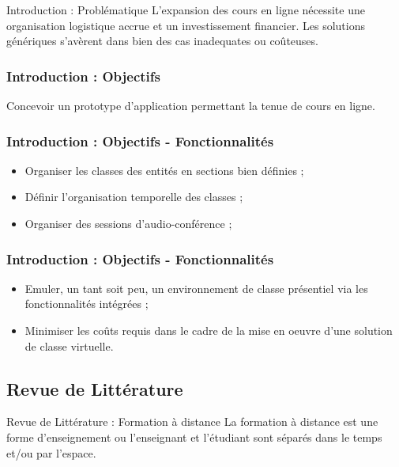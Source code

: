 \documentclass{beamer}
\begin{document}
\begin{frame}{Introduction : \small{Problématique}}
  L'expansion des cours en ligne nécessite une organisation logistique 
  accrue et un investissement financier. Les solutions génériques s'avèrent dans bien 
  des cas inadequates ou coûteuses.
\end{frame}


\begin{frame}
  \frametitle{Introduction : \small{Objectifs}}
    Concevoir un prototype d'application permettant la tenue de cours en ligne.
\end{frame}

\begin{frame}
  \frametitle{Introduction : \small{Objectifs} - \footnotesize{Fonctionnalités}}
  \begin{itemize}
    \item Organiser les classes des entités en sections bien définies ;
    \item Définir l'organisation temporelle des classes ;
    \item Organiser des sessions d’audio-conférence ;
\end{itemize}
\end{frame}

\begin{frame}
  \frametitle{Introduction : \small{Objectifs} - \footnotesize{Fonctionnalités}}
  \begin{itemize}
    \item Emuler, un tant soit peu, un environnement de classe présentiel via les fonctionnalités intégrées ;
    \item Minimiser les coûts requis dans le cadre de la mise en oeuvre d’une solution de classe virtuelle.
\end{itemize}
\end{frame}

\begin{frame}
  \begin{center}
    \section{\huge{Revue de Littérature}}
  \end{center}
\end{frame}

\begin{frame}{Revue de Littérature : \small{Formation à distance}}
  La formation à distance est une forme d’enseignement ou l’enseignant et l’étudiant sont séparés dans le temps et/ou par l’espace. 
\end{frame}
\end{document}
